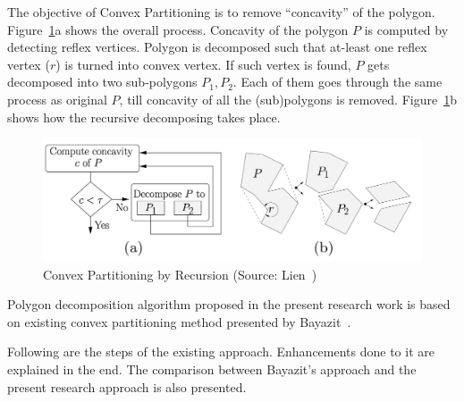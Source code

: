 The objective of Convex Partitioning is to remove ``concavity'' of the polygon. Figure~\ref{fig_LienCEP}a shows the overall process. Concavity of the polygon $P$ is computed by detecting reflex vertices. Polygon is decomposed such that at-least one reflex vertex ($r$) is turned into convex vertex. If such vertex is found, $P$ gets decomposed into two sub-polygons $P_1, P_2$. Each of them goes through the same process as original $P$, till concavity of all the (sub)polygons is removed. Figure~\ref{fig_LienCEP}b shows how the recursive decomposing takes place.



\begin{figure}[h]
\centering \includegraphics[width=0.92\linewidth]{../Common/images/LienCEP} 
\caption{Convex Partitioning by Recursion (Source: Lien~\cite{Lien2004})}
\label{fig_LienCEP}
\end{figure}


Polygon decomposition algorithm proposed in the present research work is based on existing convex partitioning method presented by Bayazit~\cite{Bayazit}. 

Following are the steps of the existing approach. Enhancements done to it are explained in the end.  The comparison between Bayazit's approach and the present research approach is also presented.


